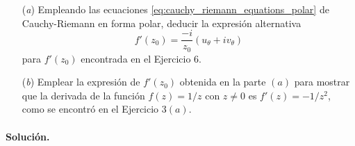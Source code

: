 \documentclass[a4paper]{report}
\begin{document}
\begin{enumerate}
 \item[(\textit{a})] Empleando las ecuaciones \ref{eq:cauchy_riemann_equations_polar} de Cauchy-Riemann en forma polar, deducir la expresión alternativa
 \begin{equation}\label{eq:f_derivative_polar_partial_theta}
  f'(z_0)=\frac{-i}{z_0}(u_\theta+iv_\theta)
 \end{equation}
 para \(f'(z_0)\) encontrada en el Ejercicio 6.
 \item[(\textit{b})] Emplear la expresión de \(f'(z_0)\) obtenida en la parte \((a)\) para mostrar que la derivada de la función \(f(z)=1/z\) con \(z\neq0\) es \(f'(z)=-1/z^2\), como se encontró en el Ejercicio 3\((a)\).
\end{enumerate}

\paragraph{Solución.}
\end{document}
